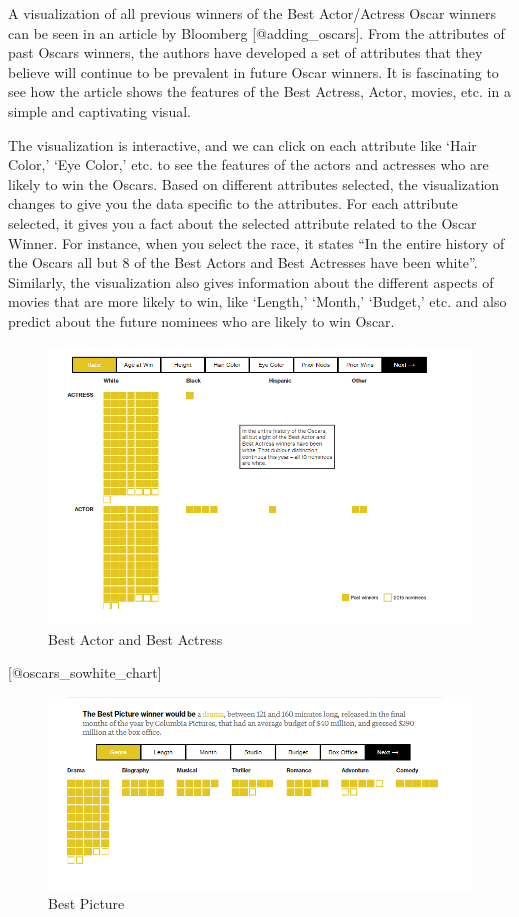\documentclass[]{book}
\theoremstyle{definition}
\theoremstyle{definition}
\theoremstyle{definition}
\theoremstyle{remark}
\begin{document}
A visualization of all previous winners of the Best Actor/Actress Oscar
winners can be seen in an article by Bloomberg {[}@adding\_oscars{]}.
From the attributes of past Oscars winners, the authors have developed a
set of attributes that they believe will continue to be prevalent in
future Oscar winners. It is fascinating to see how the article shows the
features of the Best Actress, Actor, movies, etc. in a simple and
captivating visual.

The visualization is interactive, and we can click on each attribute
like `Hair Color,' `Eye Color,' etc. to see the features of the actors
and actresses who are likely to win the Oscars. Based on different
attributes selected, the visualization changes to give you the data
specific to the attributes. For each attribute selected, it gives you a
fact about the selected attribute related to the Oscar Winner. For
instance, when you select the race, it states ``In the entire history of
the Oscars all but 8 of the Best Actors and Best Actresses have been
white''. Similarly, the visualization also gives information about the
different aspects of movies that are more likely to win, like `Length,'
`Month,' `Budget,' etc. and also predict about the future nominees who
are likely to win Oscar.

\begin{figure}
\centering
\includegraphics{images/img_oscars_actors.PNG}
\caption{Best Actor and Best Actress}
\end{figure}

{[}@oscars\_sowhite\_chart{]}

\begin{figure}
\centering
\includegraphics{images/img_oscars_pic.PNG}
\caption{Best Picture}
\end{figure}
\end{document}
